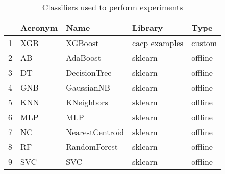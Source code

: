 \begin{table}
\footnotesize
\caption{Classifiers used to perform experiments}
\label{tab:algorithm}
\begin{tabular}{lllll}
\hline
 & Acronym & Name & Library & Type \\
\hline
1 & XGB & XGBoost & cacp examples & custom \\
2 & AB & AdaBoost & sklearn & offline \\
3 & DT & DecisionTree & sklearn & offline \\
4 & GNB & GaussianNB & sklearn & offline \\
5 & KNN & KNeighbors & sklearn & offline \\
6 & MLP & MLP & sklearn & offline \\
7 & NC & NearestCentroid & sklearn & offline \\
8 & RF & RandomForest & sklearn & offline \\
9 & SVC & SVC & sklearn & offline \\
\hline
\end{tabular}
\end{table}
